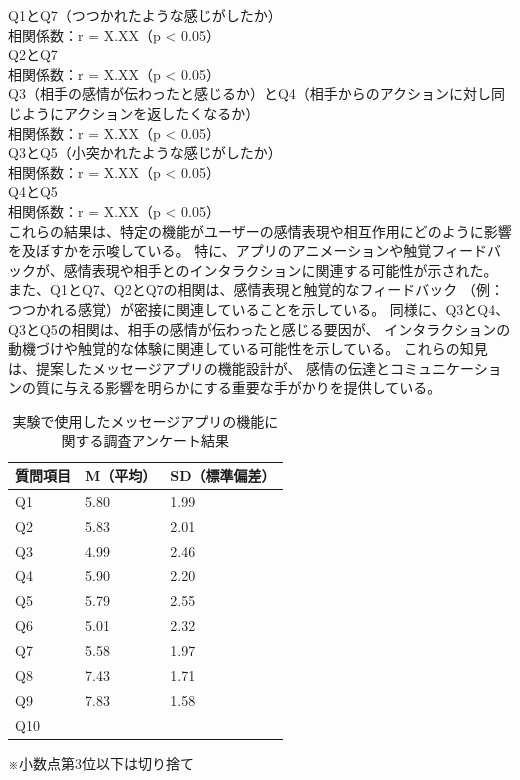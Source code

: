 \documentclass[11pt,a4paper]{ltjsreport}
\newcommand{\bhline}{\noalign{\hrule height 1.2pt}} %
\begin{document}
Q1とQ7（つつかれたような感じがしたか）\\
相関係数：r = X.XX（p < 0.05）\\

Q2とQ7\\
相関係数：r = X.XX（p < 0.05）\\

Q3（相手の感情が伝わったと感じるか）とQ4（相手からのアクションに対し同じようにアクションを返したくなるか）\\
相関係数：r = X.XX（p < 0.05）\\

Q3とQ5（小突かれたような感じがしたか）\\
相関係数：r = X.XX（p < 0.05）\\

Q4とQ5\\
相関係数：r = X.XX（p < 0.05）\\

これらの結果は、特定の機能がユーザーの感情表現や相互作用にどのように影響を及ぼすかを示唆している。
特に、アプリのアニメーションや触覚フィードバックが、感情表現や相手とのインタラクションに関連する可能性が示された。
また、Q1とQ7、Q2とQ7の相関は、感情表現と触覚的なフィードバック
（例：つつかれる感覚）が密接に関連していることを示している。
同様に、Q3とQ4、Q3とQ5の相関は、相手の感情が伝わったと感じる要因が、
インタラクションの動機づけや触覚的な体験に関連している可能性を示している。
これらの知見は、提案したメッセージアプリの機能設計が、
感情の伝達とコミュニケーションの質に与える影響を明らかにする重要な手がかりを提供している。

\vspace{\baselineskip} %
\begin{table}[!ph]
    \caption{実験で使用したメッセージアプリの機能に関する調査アンケート結果}
    \label{table:zikken_kekka}
    \vspace{5mm}
    \centering
    \begin{tabular}{p{3cm}p{3cm}p{3cm}} %
        \bhline
        質問項目 & M（平均） & SD（標準偏差） \\ %
        \hline
        Q1 & 5.80 & 1.99\\
        Q2 & 5.83 & 2.01\\
        Q3 & 4.99 & 2.46\\
        Q4 & 5.90 & 2.20\\
        Q5 & 5.79 & 2.55\\
        Q6 & 5.01 & 2.32\\
        Q7 & 5.58 & 1.97\\
        Q8 & 7.43 & 1.71\\
        Q9 & 7.83 & 1.58\\
        Q10 \\
        \hline
    \end{tabular}
    \vspace{1cm} %
    \parbox{0.55\textwidth}{\small ※小数点第3位以下は切り捨て}
\end{table}
\end{document}
